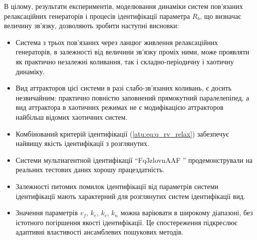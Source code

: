 В цілому, результати експериментів, моделювання динаміки систем
пов'язаних релаксаційних генераторів і процесів ідентифікації
параметра
$ R_b $, що визначає величину зв'язку, дозволяють зробити
наступні висновки:

\begin{itemize}

  \item
    Система з трьох пов'язаних через ланцюг живлення релаксаційних
    генераторів, в залежності від величини зв'язку проміх ними,
    може проявляти як практично незалежні коливання, так і
    складно-періодичну і хаотичну динаміку.


  \item
    Вид аттракторов цієї системи в разі слабо-зв'язаних коливань, є
    досить незвичайним: практично повністю заповнений прямокутний
    паралелепіпед, а вид аттрактора в хаотичних режимах не є
    модифікацією аттракторов найбільш відомих хаотичних систем.


  \item
    Комбінований критерій ідентифікації (\ref{atu:eq:q_rv_relax}) забезпечує
    найвищу якість ідентифікації з розглянутих.

  \item
    Системи мультиагентной ідентифікації ``Fq3zlovnAAF ''
    продемонстрували на реальних тестових даних хорошу
    працездатність.

  \item
    Залежності питомих помилок ідентифікації від параметрів
    системи ідентифікації мають характерний для розглянутих систем
    ідентифікації вид.

  \item
    Значення параметрів
    $ v_f $,
    $ k_e $,
    $ k_c $,
    $ k_n $ можна варіювати в широкому діапазоні, без істотного
    погіршення якості ідентифікації. Це спостереження підкреслює
    адаптивні властивості ансамблевих пошукових методів.

\end{itemize}




